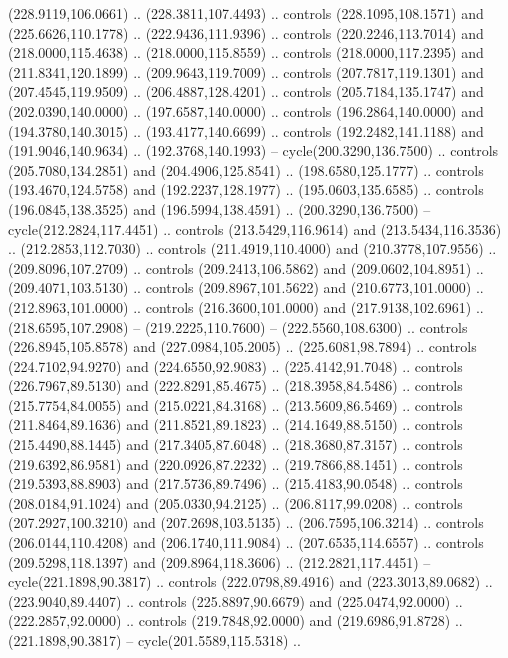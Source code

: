   (228.9119,106.0661) .. (228.3811,107.4493) .. controls (228.1095,108.1571) and
  (225.6626,110.1778) .. (222.9436,111.9396) .. controls (220.2246,113.7014) and
  (218.0000,115.4638) .. (218.0000,115.8559) .. controls (218.0000,117.2395) and
  (211.8341,120.1899) .. (209.9643,119.7009) .. controls (207.7817,119.1301) and
  (207.4545,119.9509) .. (206.4887,128.4201) .. controls (205.7184,135.1747) and
  (202.0390,140.0000) .. (197.6587,140.0000) .. controls (196.2864,140.0000) and
  (194.3780,140.3015) .. (193.4177,140.6699) .. controls (192.2482,141.1188) and
  (191.9046,140.9634) .. (192.3768,140.1993) -- cycle(200.3290,136.7500) ..
  controls (205.7080,134.2851) and (204.4906,125.8541) .. (198.6580,125.1777) ..
  controls (193.4670,124.5758) and (192.2237,128.1977) .. (195.0603,135.6585) ..
  controls (196.0845,138.3525) and (196.5994,138.4591) .. (200.3290,136.7500) --
  cycle(212.2824,117.4451) .. controls (213.5429,116.9614) and
  (213.5434,116.3536) .. (212.2853,112.7030) .. controls (211.4919,110.4000) and
  (210.3778,107.9556) .. (209.8096,107.2709) .. controls (209.2413,106.5862) and
  (209.0602,104.8951) .. (209.4071,103.5130) .. controls (209.8967,101.5622) and
  (210.6773,101.0000) .. (212.8963,101.0000) .. controls (216.3600,101.0000) and
  (217.9138,102.6961) .. (218.6595,107.2908) -- (219.2225,110.7600) --
  (222.5560,108.6300) .. controls (226.8945,105.8578) and (227.0984,105.2005) ..
  (225.6081,98.7894) .. controls (224.7102,94.9270) and (224.6550,92.9083) ..
  (225.4142,91.7048) .. controls (226.7967,89.5130) and (222.8291,85.4675) ..
  (218.3958,84.5486) .. controls (215.7754,84.0055) and (215.0221,84.3168) ..
  (213.5609,86.5469) .. controls (211.8464,89.1636) and (211.8521,89.1823) ..
  (214.1649,88.5150) .. controls (215.4490,88.1445) and (217.3405,87.6048) ..
  (218.3680,87.3157) .. controls (219.6392,86.9581) and (220.0926,87.2232) ..
  (219.7866,88.1451) .. controls (219.5393,88.8903) and (217.5736,89.7496) ..
  (215.4183,90.0548) .. controls (208.0184,91.1024) and (205.0330,94.2125) ..
  (206.8117,99.0208) .. controls (207.2927,100.3210) and (207.2698,103.5135) ..
  (206.7595,106.3214) .. controls (206.0144,110.4208) and (206.1740,111.9084) ..
  (207.6535,114.6557) .. controls (209.5298,118.1397) and (209.8964,118.3606) ..
  (212.2821,117.4451) -- cycle(221.1898,90.3817) .. controls (222.0798,89.4916)
  and (223.3013,89.0682) .. (223.9040,89.4407) .. controls (225.8897,90.6679)
  and (225.0474,92.0000) .. (222.2857,92.0000) .. controls (219.7848,92.0000)
  and (219.6986,91.8728) .. (221.1898,90.3817) -- cycle(201.5589,115.5318) ..
